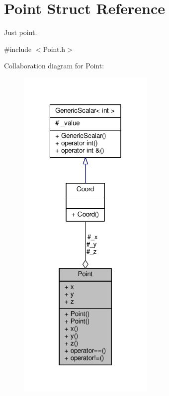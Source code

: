 \hypertarget{struct_point}{\section{Point Struct Reference}
\label{struct_point}
}


Just point.  




{\ttfamily \#include $<$Point.\-h$>$}



Collaboration diagram for Point\-:
\nopagebreak
\begin{figure}[H]
\begin{center}
\leavevmode
\includegraphics[width=186pt]{struct_point__coll__graph}
\end{center}
\end{figure}
